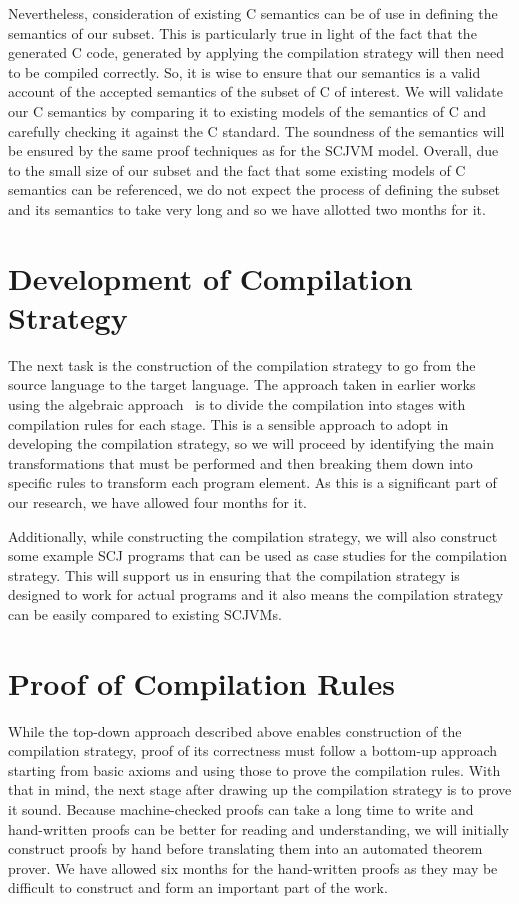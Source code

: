 \documentclass[a4paper,10pt]{report}
\begin{document}
Nevertheless, consideration of existing C semantics can be of use in
defining the semantics of our subset.
This is particularly true in light of the fact that the generated C
code, generated by applying the compilation strategy will then need to
be compiled correctly.
So, it is wise to ensure that our semantics is a valid account of the
accepted semantics of the subset of C of interest.
We will validate our C semantics by comparing it to existing models of
the semantics of C and carefully checking it against the C standard.
The soundness of the semantics will be ensured by the same proof
techniques as for the SCJVM model.
Overall, due to the small size of our subset and the fact that some
existing models of C semantics can be referenced, we do not expect the
process of defining the subset and its semantics to take very long and
so we have allotted two months for it.

\section{Development of Compilation Strategy}

The next task is the construction of the compilation strategy to go
from the source language to the target language.
The approach taken in earlier works using the algebraic
approach~\cite{sampaio1993,duran2005} is to divide the compilation
into stages with compilation rules for each stage.
This is a sensible approach to adopt in developing the compilation
strategy, so we will proceed by identifying the main transformations
that must be performed and then breaking them down into specific rules
to transform each program element.
As this is a significant part of our research, we have allowed four
months for it.

Additionally, while constructing the compilation strategy, we will
also construct some example SCJ programs that can be used as case
studies for the compilation strategy.
This will support us in ensuring that the compilation strategy is
designed to work for actual programs and it also means the
compilation strategy can be easily compared to existing SCJVMs.

\section{Proof of Compilation Rules}

While the top-down approach described above enables construction of
the compilation strategy, proof of its correctness must follow a 
bottom-up approach starting from basic axioms and using
those to prove the compilation rules.
With that in mind, the next stage after drawing up the compilation
strategy is to prove it sound.
Because machine-checked proofs can take a long time to write and
hand-written proofs can be better for reading and understanding,
we will initially construct proofs by hand before translating them
into an automated theorem prover.
We have allowed six months for the hand-written proofs as they may be
difficult to construct and form an important part of the work.
\end{document}
